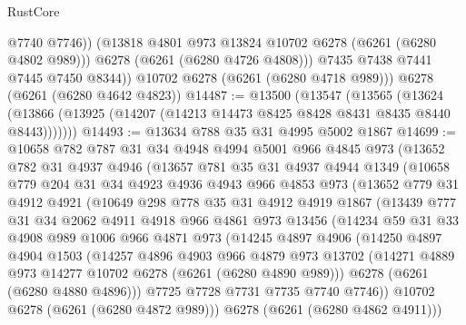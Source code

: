 \begin{lexlean}{RustCore}
\begin{coremodule}
                @7740
                @7746))
            (@13818 @4801 @973 @13824 @10702 @6278 (@6261 (@6280 @4802 @989)))
            @6278
            (@6261 (@6280 @4726 @4808)))
          @7435
          @7438
          @7441
          @7445
          @7450
          @8344))
      @10702
      @6278
      (@6261 (@6280 @4718 @989)))
    @6278
    (@6261 (@6280 @4642 @4823))
@14487 := @13500
    (@13547
      (@13565
        (@13624 (@13866 (@13925 (@14207 (@14213 @14473 @8425 @8428 @8431 @8435 @8440 @8443)))))))
@14493 := @13634 @788 @35 @31 @4995 @5002 @1867
@14699 := @10658
    @782
    @787
    @31
    @34
    @4948
    @4994
    @5001
    @966
    @4845
    @973
    (@13652
      @782
      @31
      @4937
      @4946
      (@13657
        @781
        @35
        @31
        @4937
        @4944
        @1349
        (@10658
          @779
          @204
          @31
          @34
          @4923
          @4936
          @4943
          @966
          @4853
          @973
          (@13652
            @779
            @31
            @4912
            @4921
            (@10649
              @298
              @778
              @35
              @31
              @4912
              @4919
              @1867
              (@13439
                @777
                @31
                @34
                @2062
                @4911
                @4918
                @966
                @4861
                @973
                @13456
                (@14234
                  @59
                  @31
                  @33
                  @4908
                  @989
                  @1006
                  @966
                  @4871
                  @973
                  (@14245
                    @4897
                    @4906
                    (@14250
                      @4897
                      @4904
                      @1503
                      (@14257
                        @4896
                        @4903
                        @966
                        @4879
                        @973
                        @13702
                        (@14271 @4889 @973 @14277 @10702 @6278 (@6261 (@6280 @4890 @989)))
                        @6278
                        (@6261 (@6280 @4880 @4896)))
                      @7725
                      @7728
                      @7731
                      @7735
                      @7740
                      @7746))
                  @10702
                  @6278
                  (@6261 (@6280 @4872 @989)))
                @6278
                (@6261 (@6280 @4862 @4911)))

\end{coremodule}
\end{lexlean}
